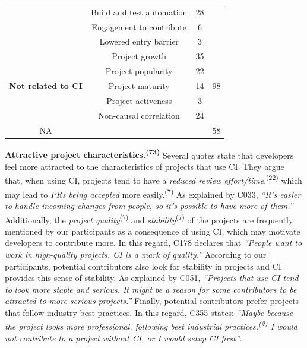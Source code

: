 \begin{table}
\begin{tabular}{cccc}
\cline{3-3}          & \multicolumn{1}{p{14em}}{Build and test automation} & 28    &  \bigstrut\\
\cline{2-3}          & \multicolumn{1}{p{14em}}{Engagement to contribute} & 6     &  \bigstrut\\
\cline{2-3}          & \multicolumn{1}{p{14em}}{Lowered entry barrier} & 3     &  \bigstrut\\
    \hline
    \multicolumn{1}{c}{\multirow{5}[10]{*}{\textbf{Not related to CI}}} & \multicolumn{1}{p{14em}}{Project growth} & 35    & \multirow{5}[10]{*}{98} \bigstrut\\
\cline{2-3}          & \multicolumn{1}{p{14em}}{Project popularity} & 22    &  \bigstrut\\
\cline{2-3}          & \multicolumn{1}{p{14em}}{Project maturity} & 14    &  \bigstrut\\
\cline{2-3}          & \multicolumn{1}{p{14em}}{Project activeness} & 3     &  \bigstrut\\
\cline{2-3}          & \multicolumn{1}{p{14em}}{Non-causal correlation} & 24    &  \bigstrut\\
    \hline
    NA    &       &       & 58 \bigstrut\\
    \hline
    \end{tabular}%
		\label{tab:ci_impact_on_attracting_contributors}%
	\end{table}%

\vspace{1mm}
\noindent\textbf{Attractive project characteristics.\textsuperscript{(73)}}
Several quotes state that developers feel more attracted to the characteristics of projects that use CI. They argue that, when using CI, projects tend to have a \textit{reduced review effort/time},\textsuperscript{(22)} which may lead to \textit{PRs being accepted} more easily.\textsuperscript{(7)} As explained by C033, \textit{``It's easier to handle incoming changes from people, so it's possible to have more of them.''} 
Additionally, the \textit{project quality}\textsuperscript{(7)} and \textit{stability}\textsuperscript{(7)} of the projects are frequently mentioned by our participants as a consequence of using CI, which may motivate developers to contribute more. In this regard, 
C178 declares that \textit{``People want to work in high-quality projects. CI is a mark of quality.''} According to our participants, potential contributors also look for stability in projects and CI provides this sense of stability. As explained by C051,
\textit{``Projects that use CI tend to look more stable and serious. It might be a reason for some contributors to be attracted to more serious projects.''}
 Finally, potential contributors prefer projects that follow industry best practices. In this regard, C355 states: \textit{``Maybe because the project looks more professional, following \textit{best industrial practices}.\textsuperscript{(2)} I would not contribute to a project without CI, or I would setup CI first''}.

